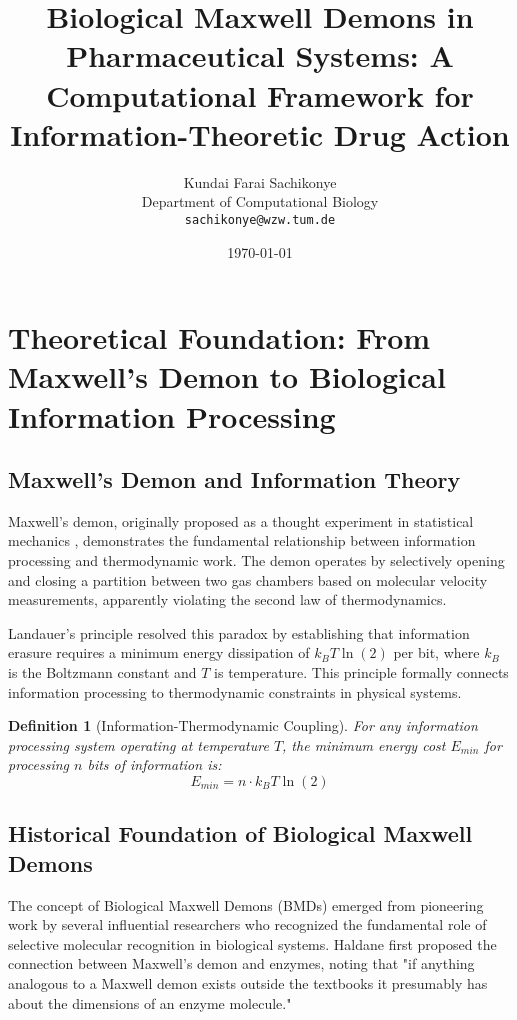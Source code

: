 \documentclass[12pt,a4paper]{article}
\title{Biological Maxwell Demons in Pharmaceutical Systems: A Computational Framework for Information-Theoretic Drug Action}
\author{Kundai Farai Sachikonye\\
Department of Computational Biology\\
\texttt{sachikonye@wzw.tum.de}}
\date{\today}
\newtheorem{definition}{Definition}[section]
\begin{document}
\maketitle

\section{Theoretical Foundation: From Maxwell's Demon to Biological Information Processing}

\subsection{Maxwell's Demon and Information Theory}

Maxwell's demon, originally proposed as a thought experiment in statistical mechanics \citep{maxwell1867theory}, demonstrates the fundamental relationship between information processing and thermodynamic work. The demon operates by selectively opening and closing a partition between two gas chambers based on molecular velocity measurements, apparently violating the second law of thermodynamics.

Landauer's principle \citep{landauer1961irreversibility} resolved this paradox by establishing that information erasure requires a minimum energy dissipation of $k_B T \ln(2)$ per bit, where $k_B$ is the Boltzmann constant and $T$ is temperature. This principle formally connects information processing to thermodynamic constraints in physical systems.

\begin{definition}[Information-Thermodynamic Coupling]
For any information processing system operating at temperature $T$, the minimum energy cost $E_{min}$ for processing $n$ bits of information is:
\begin{equation}
E_{min} = n \cdot k_B T \ln(2)
\end{equation}
\end{definition}

\subsection{Historical Foundation of Biological Maxwell Demons}

The concept of Biological Maxwell Demons (BMDs) emerged from pioneering work by several influential researchers who recognized the fundamental role of selective molecular recognition in biological systems. Haldane \citep{haldane1930} first proposed the connection between Maxwell's demon and enzymes, noting that "if anything analogous to a Maxwell demon exists outside the textbooks it presumably has about the dimensions of an enzyme molecule."
\end{document}
